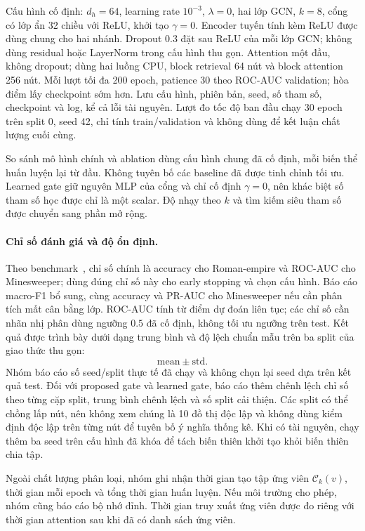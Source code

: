 \documentclass[12pt,a4paper]{article}
\numberwithin{equation}{section}
\theoremstyle{definition}
\begin{document}
Cấu hình cố định: $d_h=64$, learning rate $10^{-3}$, $\lambda=0$, hai lớp GCN, $k=8$, cổng có lớp ẩn 32 chiều với ReLU, khởi tạo $\gamma=0$. Encoder tuyến tính kèm ReLU được dùng chung cho hai nhánh. Dropout 0.3 đặt sau ReLU của mỗi lớp GCN; không dùng residual hoặc LayerNorm trong cấu hình thu gọn. Attention một đầu, không dropout; dùng hai luồng CPU, block retrieval 64 nút và block attention 256 nút. Mỗi lượt tối đa 200 epoch, patience 30 theo ROC-AUC validation; hòa điểm lấy checkpoint sớm hơn. Lưu cấu hình, phiên bản, seed, số tham số, checkpoint và log, kể cả lỗi tài nguyên. Lượt đo tốc độ ban đầu chạy 30 epoch trên split 0, seed 42, chỉ tính train/validation và không dùng để kết luận chất lượng cuối cùng.

So sánh mô hình chính và ablation dùng cấu hình chung đã cố định, mỗi biến thể huấn luyện lại từ đầu. Không tuyên bố các baseline đã được tinh chỉnh tối ưu. Learned gate giữ nguyên MLP của cổng và chỉ cố định $\gamma=0$, nên khác biệt số tham số học được chỉ là một scalar. Độ nhạy theo $k$ và tìm kiếm siêu tham số được chuyển sang phần mở rộng.

\paragraph{Chỉ số đánh giá và độ ổn định.}
Theo benchmark~\cite{platonov2023critical}, chỉ số chính là accuracy cho Roman-empire và ROC-AUC cho Minesweeper; dùng đúng chỉ số này cho early stopping và chọn cấu hình. Báo cáo macro-F1 bổ sung, cùng accuracy và PR-AUC cho Minesweeper nếu cần phân tích mất cân bằng lớp. ROC-AUC tính từ điểm dự đoán liên tục; các chỉ số cần nhãn nhị phân dùng ngưỡng $0.5$ đã cố định, không tối ưu ngưỡng trên test. Kết quả được trình bày dưới dạng trung bình và độ lệch chuẩn mẫu trên ba split của giao thức thu gọn:
\[
\text{mean}\pm\text{std}.
\]
Nhóm báo cáo số seed/split thực tế đã chạy và không chọn lại seed dựa
trên kết quả test.
Đối với proposed gate và learned gate, báo cáo thêm chênh lệch chỉ số theo từng cặp split, trung bình chênh lệch và số split cải thiện. Các split có thể chồng lấp nút, nên không xem chúng là 10 đồ thị độc lập và không dùng kiểm định độc lập trên từng nút để tuyên bố ý nghĩa thống kê. Khi có tài nguyên, chạy thêm ba seed trên cấu hình đã khóa để tách biến thiên khởi tạo khỏi biến thiên chia tập.

Ngoài chất lượng phân loại, nhóm ghi nhận thời gian tạo tập ứng viên
$\mathcal{C}_k(v)$, thời gian mỗi epoch và tổng thời gian huấn luyện.
Nếu môi trường cho phép, nhóm cũng báo cáo bộ nhớ đỉnh. Thời gian truy
xuất ứng viên được đo riêng với thời gian attention sau khi đã có danh
sách ứng viên.
\end{document}
